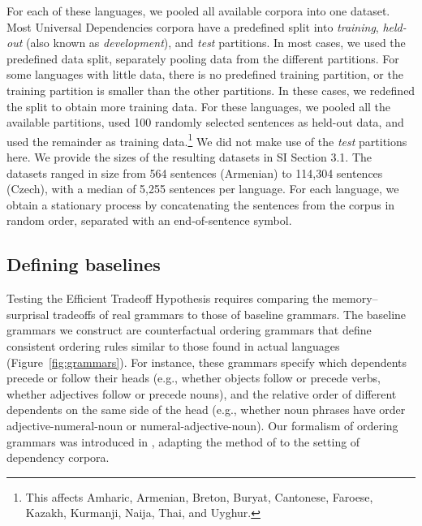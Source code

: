 For each of these languages, we pooled all available corpora into one dataset.
Most Universal Dependencies corpora have a predefined split into \emph{training}, \emph{held-out} (also known as \emph{development}), and \emph{test} partitions.
In most cases, we used the predefined data split, separately pooling data from the different partitions. 
For some languages with little data, there is no predefined training partition, or the training partition is smaller than the other partitions.
In these cases, we redefined the split to obtain more training data.
For these languages, we pooled all the available partitions, used 100 randomly selected sentences as held-out data, and used the remainder as training data.\footnote{This affects Amharic, Armenian, Breton, Buryat, Cantonese, Faroese, Kazakh, Kurmanji, Naija, Thai, and Uyghur.}
We did not make use of the \textit{test} partitions here.
We provide the sizes of the resulting datasets in SI Section 3.1.
The datasets ranged in size from 564 sentences (Armenian) to 114,304 sentences (Czech), with a median of 5,255 sentences per language.
For each language, we obtain a stationary process by concatenating the sentences from the corpus in random order, separated with an end-of-sentence symbol.


\subsection{Defining baselines}\label{sec:baselines}

Testing the Efficient Tradeoff Hypothesis requires comparing the memory--surprisal tradeoffs of real grammars to those of baseline grammars. The baseline grammars we construct are counterfactual ordering grammars that define consistent ordering rules similar to those found in actual languages (Figure~\ref{fig:grammars}).
For instance, these grammars specify which dependents precede or follow their heads (e.g., whether objects follow or precede verbs, whether adjectives follow or precede nouns), and the relative order of different dependents on the same side of the head (e.g., whether noun phrases have order adjective-numeral-noun or numeral-adjective-noun). Our formalism of ordering grammars was introduced in \citet{hahn2020universals}, adapting the method of \citet{gildea-optimizing-2007,gildea-grammars-2010} to the setting of dependency corpora.


